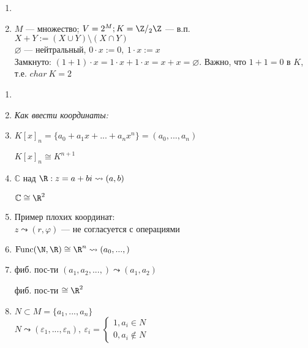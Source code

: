 \begin{example}
    \begin{enumerate}
        \item[]
        \item $M$ — множество; $V=2^M; K=\Z/_2\Z$ — в.п. \\
        $X+Y:=(X\cup Y)\setminus (X\cap Y)$ \\    $\varnothing$ — 
нейтральный, $0\cdot x:=0,\ 1\cdot x:=x$ \\
        Замкнуто: $(1+1)\cdot x=1\cdot x+ 1\cdot x=x+x=\varnothing$. 
Важно, что $1+1=0$ в $K$, т.е. $char\ K=2$
    \end{enumerate}
\end{example}

\begin{example}
    \begin{enumerate}
        \item[]
        \item[] \textit{Как ввести координаты:}
        \item $K[x]_n=\{a_0+a_1x+...+a_nx^n\}=(a_0,...,a_n)$ 
        
        $K[x]_n\cong K^{n+1}$
        \item $\mathbb{C}$ над $\R:z=a+bi\leadsto (a,b)$
        
        $\mathbb{C}\cong\R^2$
        \item Пример плохих координат: \\ $z\leadsto (r,\varphi)$ — не 
согласуется с операциями
        \item $\text{Func}(\N,\R)\cong \R^n\leadsto (a_0,...,)$
        \item  фиб. пос-ти $(a_1,a_2,...,)\leadsto(a_1,a_2)$
        
        фиб. пос-ти $\cong \R^2$
        \item $N\subset M=\{a_1,...,a_n\}$ \\    $N\leadsto 
(\varepsilon_1,..., \varepsilon_n),\ \varepsilon_i=\begin{cases}1,a_i\in N 
\\ 0,a_i\notin N\end{cases}$
    \end{enumerate}
\end{example}
